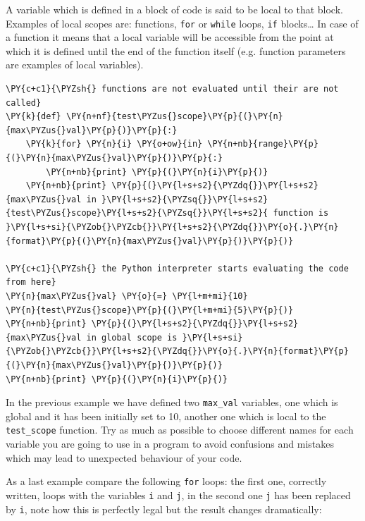 A variable which is defined in a block of code is said to be local to that block. 
Examples of local scopes are: functions, \texttt{for} or \texttt{while} loops, \texttt{if} blocks\ldots 
In case of a function it means that a local variable will be accessible from the point at which it 
is defined until the end of the function itself (e.g. function parameters are examples of local variables).

\begin{codebox}
\begin{Verbatim}[commandchars=\\\{\}]
\PY{c+c1}{\PYZsh{} functions are not evaluated until their are not called}
\PY{k}{def} \PY{n+nf}{test\PYZus{}scope}\PY{p}{(}\PY{n}{max\PYZus{}val}\PY{p}{)}\PY{p}{:}
    \PY{k}{for} \PY{n}{i} \PY{o+ow}{in} \PY{n+nb}{range}\PY{p}{(}\PY{n}{max\PYZus{}val}\PY{p}{)}\PY{p}{:}
        \PY{n+nb}{print} \PY{p}{(}\PY{n}{i}\PY{p}{)}
    \PY{n+nb}{print} \PY{p}{(}\PY{l+s+s2}{\PYZdq{}}\PY{l+s+s2}{max\PYZus{}val in }\PY{l+s+s2}{\PYZsq{}}\PY{l+s+s2}{test\PYZus{}scope}\PY{l+s+s2}{\PYZsq{}}\PY{l+s+s2}{ function is }\PY{l+s+si}{\PYZob{}\PYZcb{}}\PY{l+s+s2}{\PYZdq{}}\PY{o}{.}\PY{n}{format}\PY{p}{(}\PY{n}{max\PYZus{}val}\PY{p}{)}\PY{p}{)}
    
\PY{c+c1}{\PYZsh{} the Python interpreter starts evaluating the code from here}
\PY{n}{max\PYZus{}val} \PY{o}{=} \PY{l+m+mi}{10}
\PY{n}{test\PYZus{}scope}\PY{p}{(}\PY{l+m+mi}{5}\PY{p}{)}
\PY{n+nb}{print} \PY{p}{(}\PY{l+s+s2}{\PYZdq{}}\PY{l+s+s2}{max\PYZus{}val in global scope is }\PY{l+s+si}{\PYZob{}\PYZcb{}}\PY{l+s+s2}{\PYZdq{}}\PY{o}{.}\PY{n}{format}\PY{p}{(}\PY{n}{max\PYZus{}val}\PY{p}{)}\PY{p}{)}
\PY{n+nb}{print} \PY{p}{(}\PY{n}{i}\PY{p}{)}
\end{Verbatim}
\end{codebox}

In the previous example we have defined two \texttt{max\_val} variables, one which is global 
and it has been initially set to 10, another one which is local to the \texttt{test\_scope} function.
Try as much as possible to choose different names for each variable you are going to use 
in a program to avoid confusions and mistakes which may lead to unexpected behaviour of your code.

As a last example compare the following \texttt{for} loops: the first one, correctly written, 
loops with the variables \texttt{i} and \texttt{j}, in the second one \texttt{j} has been 
replaced by \texttt{i}, note how this is perfectly legal but the result changes dramatically:

